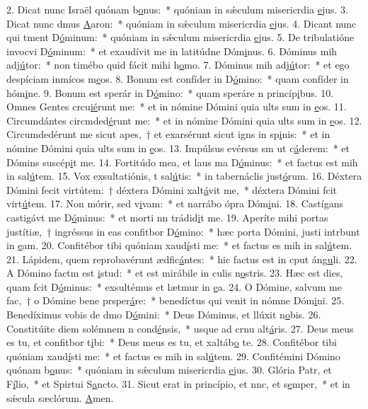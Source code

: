 2. Dicat nunc Israël quónam b\uline{o}nus:~* quóniam in sǽculum misericrdia \uline{e}jus.
3. Dicat nunc dmus \uline{A}aron:~* quóniam in sǽculum misericrdia \uline{e}jus.
4. Dicant nunc qui tment D\uline{ó}minum:~* quóniam in sǽculum misericrdia \uline{e}jus.
5. De tribulatióne invocvi D\uline{ó}minum:~* et exaudívit me in latitúdne Dóm\uline{i}nus.
6. Dóminus mih adj\uline{ú}tor:~* non timébo quid fácit mihi h\uline{o}mo.
7. Dóminus mih adj\uline{ú}tor:~* et ego despíciam inmícos m\uline{e}os.
8. Bonum est confíder in D\uline{ó}mino:~* quam confíder in hóm\uline{i}ne.
9. Bonum est sperár in D\uline{ó}mino:~* quam speráre n princíp\uline{i}bus.
10. Omnes Gentes crcu\uline{ié}runt me:~* et in nómine Dómini quia ults sum in \uline{e}os.
11. Circumdántes circmded\uline{é}runt me:~* et in nómine Dómini quia ults sum in \uline{e}os.
12. Circumdedérunt me sicut apes,~† et exarsérunt sicut igns in sp\uline{i}nis:~* et in nómine Dómini quia ults sum in \uline{e}os.
13. Impúlsus evérsus sm ut c\uline{á}derem:~* et Dómins suscép\uline{i}t me.
14. Fortitúdo mea, et laus ma D\uline{ó}minus:~* et factus est mih in sal\uline{ú}tem.
15. Vox exsultatiónis, t sal\uline{ú}tis:~* in tabernáclis just\uline{ó}rum.
16. Déxtera Dómini fecit virtútem:~† déxtera Dómini xalt\uline{á}vit me,~* déxtera Dómini fcit virt\uline{ú}tem.
17. Non mórir, sed v\uline{i}vam:~* et narrábo ópra Dóm\uline{i}ni.
18. Castígans castigávt me D\uline{ó}minus:~* et morti nn trádid\uline{i}t me.
19. Aperíte mihi portas justítiæ,~† ingréssus in eas confitbor D\uline{ó}mino:~* hæc porta Dómini, justi intrbunt in \uline{e}am.
20. Confitébor tibi quóniam xaud\uline{í}sti me:~* et factus es mih in sal\uline{ú}tem.
21. Lápidem, quem reprobavérunt ædfic\uline{á}ntes:~* hic factus est in cput áng\uline{u}li.
22. A Dómino factm est \uline{i}stud:~* et est mirábile in culis n\uline{o}stris.
23. Hæc est dies, quam fcit D\uline{ó}minus:~* exsultémus et lætmur in \uline{e}a.
24. O Dómine, salvum me fac,~† o Dómine bene prsper\uline{á}re:~* benedíctus qui venit in nómne Dóm\uline{i}ni.
25. Benedíximus vobis de dmo D\uline{ó}mini:~* Deus Dóminus, et llúxit n\uline{o}bis.
26. Constitúite diem solémnem n cond\uline{é}nsis,~* usque ad crnu alt\uline{á}ris.
27. Deus meus es tu, et confitbor t\uline{i}bi:~* Deus meus es tu, et xaltáb\uline{o} te.
28. Confitébor tibi quóniam xaud\uline{í}sti me:~* et factus es mih in sal\uline{ú}tem.
29. Confitémini Dómino quónam b\uline{o}nus:~* quóniam in sǽculum misericrdia \uline{e}jus.
30. Glória Patr, et F\uline{í}lio,~* et Spirtui S\uline{a}ncto.
31. Sicut erat in princípio, et nnc, et s\uline{e}mper,~* et in sǽcula sæclórum. \uline{A}men.

